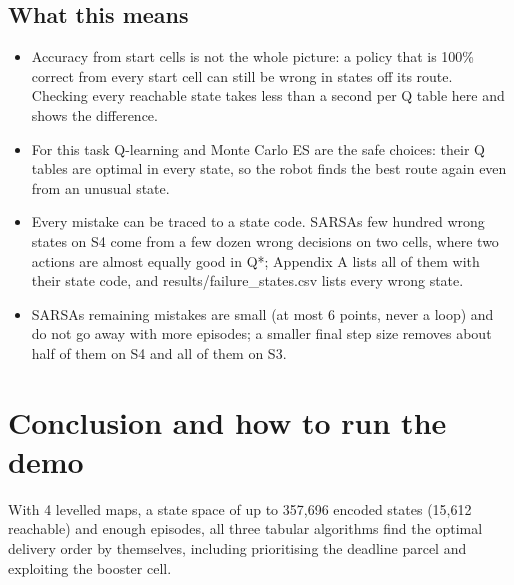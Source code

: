 \documentclass[12pt,a4paper]{article}
\begin{document}
\hypertarget{what-this-means}{%
\subsection{What this means}\label{what-this-means}}

\begin{itemize}
\item
  Accuracy from start cells is not the whole picture: a policy that is
  100\% correct from every start cell can still be wrong in states off
  its route. Checking every reachable state takes less than a second per
  Q table here and shows the difference.
\item
  For this task Q-learning and Monte Carlo ES are the safe choices:
  their Q tables are optimal in every state, so the robot finds the best
  route again even from an unusual state.
\item
  Every mistake can be traced to a state code. SARSA\textquotesingle s
  few hundred wrong states on S4 come from a few dozen wrong decisions
  on two cells, where two actions are almost equally good in Q*;
  Appendix A lists all of them with their state code, and
  results/failure\_states.csv lists every wrong state.
\item
  SARSA\textquotesingle s remaining mistakes are small (at most 6
  points, never a loop) and do not go away with more episodes; a smaller
  final step size removes about half of them on S4 and all of them on
  S3.
\end{itemize}

\hypertarget{conclusion-and-how-to-run-the-demo}{%
\section{Conclusion and how to run the
demo}\label{conclusion-and-how-to-run-the-demo}}

With 4 levelled maps, a state space of up to 357,696 encoded states
(15,612 reachable) and enough episodes, all three tabular algorithms
find the optimal delivery order by themselves, including prioritising
the deadline parcel and exploiting the booster cell.
\end{document}
